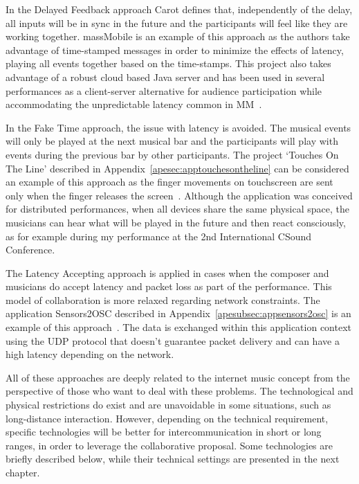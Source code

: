 In the Delayed Feedback approach Carot defines that, independently of the delay, all inputs will be in sync in the future and the participants will feel like they are working together.
massMobile is an example of this approach as the authors take advantage of time-stamped messages in order to minimize the effects of latency, playing all events together based on the time-stamps.
This project also takes advantage of a robust cloud based Java server and has been used in several performances as a client-server alternative for audience participation while accommodating the unpredictable latency common in MM~\citep{Weitzner2012massmobile}. 

In the Fake Time approach, the issue with latency is avoided.
The musical events will only be played at the next musical bar and the participants will play with events during the previous bar by other participants.
The project `Touches On The Line' described in Appendix~\ref{apesec:apptouchesontheline} can be considered an example of this approach as the finger movements on touchscreen are sent only when the finger releases the screen~\cite{deCarvalhoJunior2013touches}.
Although the application was conceived for distributed performances, when all devices share the same physical space, the musicians can hear what will be played in the future and then react consciously, as for example during my performance at the 2nd International CSound Conference. 

The Latency Accepting approach is applied in cases when the composer and musicians do accept latency and packet loss as part of the performance.
This model of collaboration is more relaxed regarding network constraints.
The application Sensors2OSC described in Appendix~\ref{apesubsec:appsensors2osc} is an example of this approach~\citep{deCarvalhoJunior2015sensors2osc}.
The data is exchanged within this application context using the UDP protocol that doesn't guarantee packet delivery and can have a high latency depending on the network.

All of these approaches are deeply related to the internet music concept from the perspective of those who want to deal with these problems.
The technological and physical restrictions do exist and are unavoidable in some situations, such as long-distance interaction.
However, depending on the technical requirement, specific technologies will be better for intercommunication in short or long ranges, in order to leverage the collaborative proposal.
Some technologies are briefly described below, while their technical settings are presented in the next chapter.

